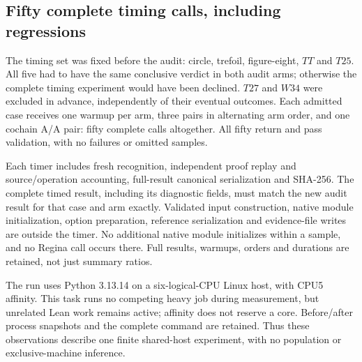\subsection{Fifty complete timing calls, including regressions}

The timing set was fixed before the audit: circle, trefoil,
figure-eight, $TT$ and $T25$.  All five had to have the same conclusive
verdict in both audit arms; otherwise the complete timing experiment
would have been declined.  $T27$ and $W34$ were excluded in advance,
independently of their eventual outcomes.  Each admitted case receives
one warmup per arm, three pairs in alternating arm order, and one
cochain A/A pair: fifty complete calls altogether.  All fifty return
and pass validation, with no failures or omitted samples.

Each timer includes fresh recognition, independent proof replay and
source/operation accounting, full-result canonical serialization and
SHA-256.  The complete timed result, including its diagnostic fields,
must match the new audit result for that case and arm exactly.
Validated input construction, native module initialization, option
preparation, reference serialization and evidence-file writes are
outside the timer.  No additional native module initializes within
a sample, and no Regina call occurs there.  Full results, warmups,
orders and durations are retained, not just summary ratios.

The run uses Python 3.13.14 on a six-logical-CPU Linux host, with CPU5
affinity.  This task runs no competing heavy job during measurement,
but unrelated Lean work remains active; affinity does not reserve a
core.  Before/after process snapshots and the complete command are
retained.  Thus these observations describe one finite shared-host
experiment, with no population or exclusive-machine inference.

